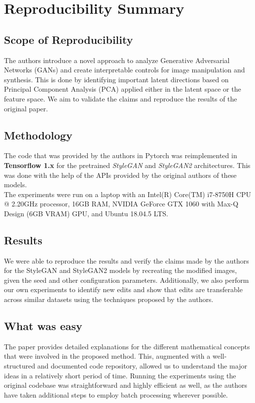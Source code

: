 \section*{Reproducibility Summary}

\subsection*{Scope of Reproducibility}

The authors introduce a novel approach to analyze Generative Adversarial Networks (GANs) and create interpretable controls for image manipulation and synthesis. This is done by identifying important latent directions based on Principal Component Analysis (PCA) applied either in the latent space or the feature space. We aim to validate the claims and reproduce the results of the original paper.

\subsection*{Methodology}

The code that was provided by the authors in Pytorch was reimplemented in \textbf{Tensorflow 1.x} for the pretrained \textit{StyleGAN} and \textit{StyleGAN2} architectures. This was done with the help of the APIs provided by the original authors of these models.
\\
The experiments were run on a laptop with an Intel(R) Core(TM) i7-8750H CPU @ 2.20GHz processor, 16GB RAM, NVIDIA GeForce GTX 1060 with Max-Q Design (6GB VRAM) GPU, and Ubuntu 18.04.5 LTS.

\subsection*{Results}

We were able to reproduce the results and verify the claims made by the authors for the StyleGAN and StyleGAN2 models by recreating the modified images, given the seed and other configuration parameters.
Additionally, we also perform our own experiments to identify new edits and show that edits are transferable across similar datasets using the techniques proposed by the authors.

\subsection*{What was easy}

The paper provides detailed explanations for the different mathematical concepts that were involved in the proposed method. This, augmented with a well-structured and documented code repository, allowed us to understand the major ideas in a relatively short period of time. Running the experiments using the original codebase was straightforward and highly efficient as well, as the authors have taken additional steps to employ batch processing wherever possible.

